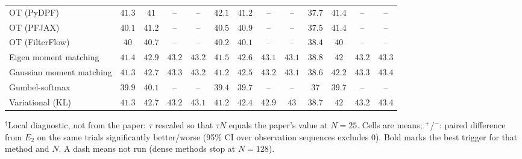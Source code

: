 \begin{table}[ht]
\begin{adjustbox}{max width=\linewidth}
\begin{tabular}{lcccc|cccc|cccc}
OT (PyDPF) & $41.3$ & $41$ & -- & -- & $42.1$ & $41.2$ & -- & -- & $37.7$ & $41.4$ & -- & -- \\
OT (PFJAX) & $40.1$ & $41.2$ & -- & -- & $40.5$ & $40.9$ & -- & -- & $37.5$ & $41.4$ & -- & -- \\
OT (FilterFlow) & $40$ & $40.7$ & -- & -- & $40.2$ & $40.1$ & -- & -- & $38.4$ & $40$ & -- & -- \\
Eigen moment matching & $41.4$ & $42.9$ & $43.2$ & $43.2$ & $41.5$ & $42.6$ & $43.1$ & $43.1$ & $38.8$ & $42$ & $43.2$ & $43.3$ \\
Gaussian moment matching & $41.3$ & $42.7$ & $43.3$ & $43.2$ & $41.2$ & $42.5$ & $43.2$ & $43.1$ & $38.6$ & $42.2$ & $43.3$ & $43.4$ \\
Gumbel-softmax & $39.9$ & $40.1$ & -- & -- & $39.4$ & $39.7$ & -- & -- & $37$ & $39.7$ & -- & -- \\
Variational (KL) & $41.3$ & $42.7$ & $43.2$ & $43.1$ & $41.2$ & $42.4$ & $42.9$ & $43$ & $38.7$ & $42$ & $43.2$ & $43.4$ \\
\bottomrule
\end{tabular}
\end{adjustbox}
\par\smallskip\parbox{0.95\linewidth}{\footnotesize $^\dagger$Local diagnostic, not from the paper: $\tau$ rescaled so that $\tau N$ equals the paper's value at $N{=}25$. Cells are means; $^{+}$/$^{-}$: paired difference from $E_2$ on the same trials significantly better/worse (95\% CI over observation sequences excludes 0). Bold marks the best trigger for that method and $N$. A dash means not run (dense methods stop at $N{=}128$).}
\end{table}

